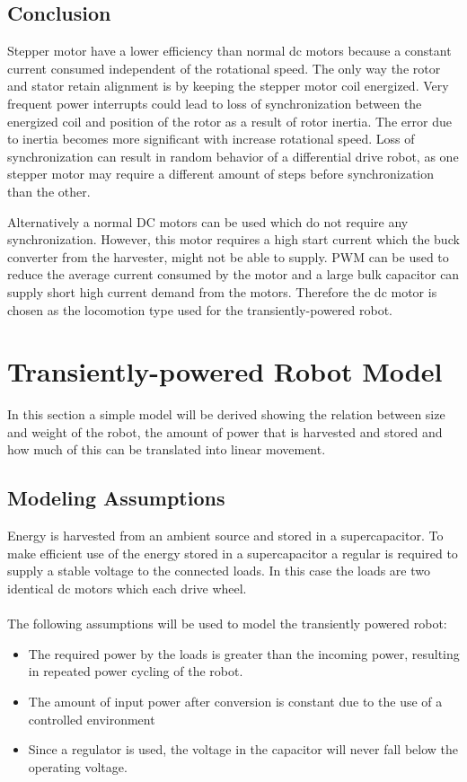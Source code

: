 \subsection{Conclusion}
Stepper motor have a lower efficiency than normal dc motors because a constant current consumed independent of the rotational speed.
The only way the rotor and stator retain alignment is by keeping the stepper motor coil energized.
Very frequent power interrupts could lead to loss of synchronization between the energized coil and position of the rotor as a result of rotor inertia.
The error due to inertia becomes more significant with increase rotational speed.
Loss of synchronization can result in random behavior of a differential drive robot, as one stepper motor may require a different amount of steps before synchronization than the other.

Alternatively a normal DC motors can be used which do not require any synchronization.
However, this motor requires a high start current which the buck converter from the harvester, might not be able to supply.
PWM can be used to reduce the average current consumed by the motor and a large bulk capacitor can supply short high current demand from the motors.
Therefore the dc motor is chosen as the locomotion type used for the transiently-powered robot.

\section{Transiently-powered Robot Model}
\label{sec:pre_transient_model}

In this section a simple model will be derived showing the relation between size and weight of the robot, the amount of power that is harvested and stored and how much of this can be translated into linear movement.

\subsection{Modeling Assumptions}

Energy is harvested from an ambient source and stored in a supercapacitor.
To make efficient use of the energy stored in a supercapacitor a regular is required to supply a stable voltage to the connected loads.
In this case the loads are two identical dc motors which each drive wheel. \\
\\ \noindent
The following assumptions will be used to model the transiently powered robot:
\begin{itemize}
	\item The required power by the loads is greater than the incoming power, resulting in repeated power cycling of the robot.
	\item The amount of input power after conversion is constant due to the use of a controlled environment
	\item Since a regulator is used, the voltage in the capacitor will never fall below the operating voltage.
\end{itemize}

